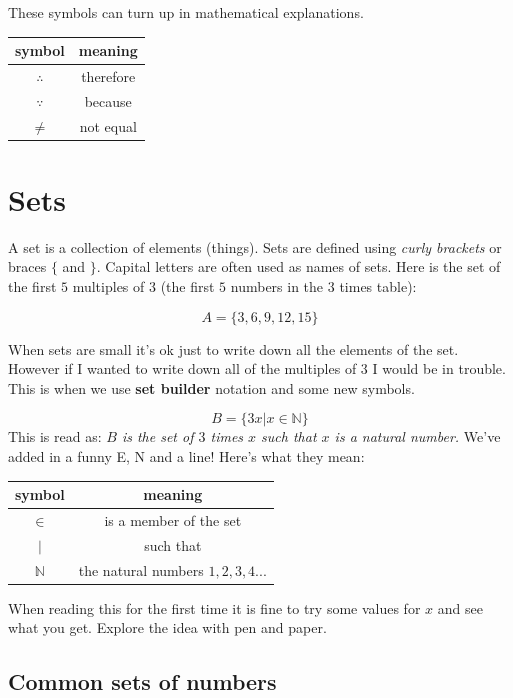 \documentclass[
  a4paper,
]{scrbook}
\newcounter{none} %
\begin{document}
These symbols can turn up in mathematical explanations.

{\def\LTcaptype{none} %
\begin{longtable}[]{@{}cc@{}}
\toprule\noalign{}
symbol & meaning \\
\midrule\noalign{}
\endhead
\bottomrule\noalign{}
\endlastfoot
\(\therefore\) & therefore \\
\(\because\) & because \\
\(\neq\) & not equal \\
\end{longtable}
}

\section{Sets}\label{sets}

A set is a collection of elements (things). Sets are defined using
\emph{curly brackets} or braces \(\{\) and \(\}\). Capital letters are
often used as names of sets. Here is the set of the first \(5\)
multiples of \(3\) (the first \(5\) numbers in the \(3\) times table):

\[A = \{3,6,9,12,15\}\]

When sets are small it's ok just to write down all the elements of the
set. However if I wanted to write down all of the multiples of \(3\) I
would be in trouble. This is when we use \textbf{set builder} notation
and some new symbols.

\[B = \{ 3x | x \in \mathbb{N} \}\] This is read as: \emph{\(B\) is the
set of \(3\) times \(x\) such that \(x\) is a natural number.} We've
added in a funny E, N and a line! Here's what they mean:

{\def\LTcaptype{none} %
\begin{longtable}[]{@{}cc@{}}
\toprule\noalign{}
symbol & meaning \\
\midrule\noalign{}
\endhead
\bottomrule\noalign{}
\endlastfoot
\(\in\) & is a member of the set \\
\(|\) & such that \\
\(\mathbb{N}\) & the natural numbers \(1,2,3,4...\) \\
\end{longtable}
}

When reading this for the first time it is fine to try some values for
\(x\) and see what you get. Explore the idea with pen and paper.

\subsection{Common sets of numbers}\label{common-sets-of-numbers}
\end{document}
